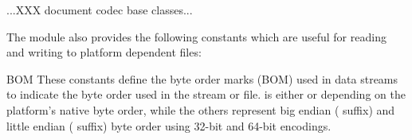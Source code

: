 ...XXX document codec base classes...



The module also provides the following constants which are useful
for reading and writing to platform dependent files:

\begin{datadesc}{BOM}
These constants define the byte order marks (BOM) used in data
streams to indicate the byte order used in the stream or file.
 is either  or 
depending on the platform's native byte order, while the others
represent big endian ( suffix) and little endian
( suffix) byte order using 32-bit and 64-bit encodings.
\end{datadesc}


